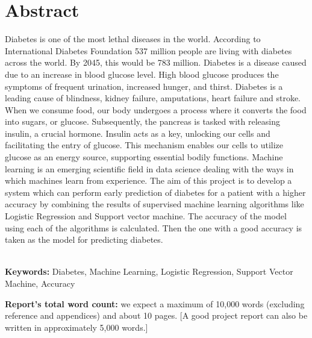 \chapter*{\center \Large  Abstract}

Diabetes is one of the most lethal diseases in the world. According to International Diabetes Foundation 537 million people are living with diabetes across the world. By 2045, this would be 783 million. Diabetes is a disease caused due to an increase in blood glucose level. High blood glucose produces the symptoms of frequent urination, increased hunger, and thirst. Diabetes is a leading cause of blindness, kidney failure, amputations, heart failure and stroke. When we consume food, our body undergoes a process where it converts the food into sugars, or glucose. Subsequently, the pancreas is tasked with releasing insulin, a crucial hormone. Insulin acts as a key, unlocking our cells and facilitating the entry of glucose. This mechanism enables our cells to utilize glucose as an energy source, supporting essential bodily functions. Machine learning is an emerging scientific field in data science dealing with the ways in which machines learn from experience. The aim of this project is to develop a system which can perform early prediction of diabetes for a patient with a higher accuracy by combining the results of supervised machine learning algorithms like Logistic Regression and Support vector machine. The accuracy of the model using each of the algorithms is calculated. Then the one with a good accuracy is taken as the model for predicting diabetes.



~\\[1cm]
\noindent %
\textbf{Keywords:} Diabetes, Machine Learning, Logistic Regression, Support Vector Machine, Accuracy

\vfill
\noindent
\textbf{Report's total word count:} we expect a maximum of 10,000 words (excluding reference and appendices) and about 10 pages. [A good project report can also be written in approximately 5,000 words.]

